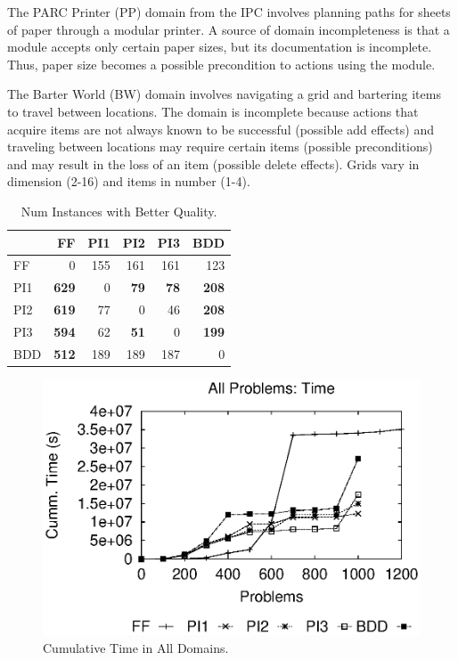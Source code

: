 \documentclass[letterpaper]{article}
\begin{document}
The PARC Printer (PP) domain from the IPC involves planning paths for sheets of
paper through a modular printer.  A source of domain incompleteness is that a
module accepts only certain paper sizes, but its documentation is incomplete. 
Thus, paper size becomes a possible precondition to actions using the module.

The Barter World (BW) domain involves navigating a grid and bartering items to
travel between locations.  The domain is incomplete because actions that acquire
 items are not always known to be successful (possible add effects) and
 traveling between locations may require
certain items (possible preconditions) and may result in the loss of an item
(possible delete effects). Grids vary in dimension (2-16) and items in number
(1-4).




\begin{table}[t]
\centering 
\begin{tabular}{|l|rrrrr|}      \hline &  FF  & PI1 & PI2  &  PI3  &  BDD  \\\hline
FF	&		0		&		155		&		161		&		161		&		123		\\
PI1	&	{\bf	629}	&		0		&	{\bf	79}	&	{\bf	78}	&	{\bf	208}	\\
PI2	&	{\bf	619}	&		77		&		0		&		46		&	{\bf	208}	\\
PI3	&	{\bf	594}	&		62		&	{\bf	51}	&		0		&	{\bf	199}	\\
BDD & {\bf 512} &  189  &  189  &  187  &  0  \\\hline
\end{tabular}																						
\caption{\label{tab:qualcomp} Num Instances with Better Quality.}
\end{table}

\begin{figure}\centering
\includegraphics[width=\linewidth]{WeberBryceICAPS11Fig2.eps}
\caption{\label{fig:alltotaltime}Cumulative Time  in  All Domains.}
\end{figure} 
   
\end{document}

